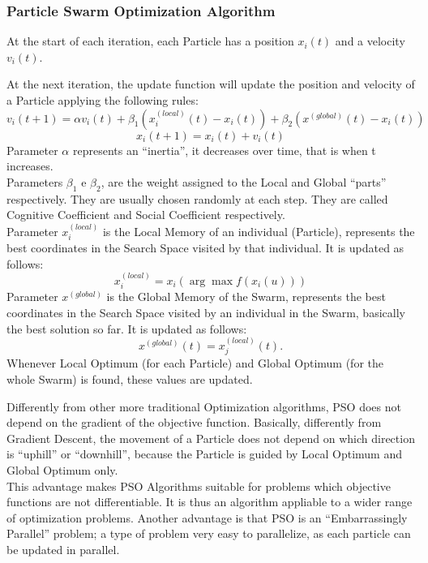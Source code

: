 \subsubsection{Particle Swarm Optimization Algorithm}

At the start of each iteration, each Particle has a position $x_i(t)$ and a velocity $v_i(t)$.

\label{sec:hyperlink-2}
At the next iteration, the update function will update the position and velocity of a Particle applying the following rules:
\begin{equation}
	v_i(t+1) = \alpha v_i(t) + \beta_1(x_i^{(local)}(t) - x_i(t)) + \beta_2(x^{(global)}(t) - x_i(t))
\end{equation}
\begin{equation}
	x_i(t+1) = x_i(t) + v_i(t)
\end{equation}
Parameter $\alpha$ represents an “inertia”, it decreases over time, that is when t increases.
\\[0.3cm]Parameters $\beta_1$ e $\beta_2$, are the weight assigned to the Local and Global “parts” respectively. They are usually chosen randomly at each step. They are called Cognitive Coefficient and Social Coefficient respectively.
\\[0.3cm]Parameter  $x_i^{(local)}$  is the Local Memory of an individual (Particle), represents the best coordinates in the Search Space visited by that individual. It is updated as follows:
\begin{equation}
	x_i^{(local)} = x_i(\arg \max f(x_i(u)))
\end{equation}
Parameter $x^{(global)}$ is the Global Memory of the Swarm, represents the best coordinates in the Search Space visited by an individual in the Swarm, basically the best solution so far. It is updated as follows:
\begin{equation}
	x^{(global)}(t) = x_j^{(local)}(t).
\end{equation}
Whenever Local Optimum (for each Particle) and Global Optimum (for the whole Swarm) is found, these values are updated.

Differently from other more traditional Optimization algorithms, PSO does not depend on the gradient of the objective function.
Basically, differently from Gradient Descent, the movement of a Particle does not depend on which direction is “uphill” or “downhill”, because the Particle is guided by Local Optimum and Global Optimum only.
\\[0.3cm]This advantage makes PSO Algorithms suitable for problems which objective functions are not differentiable. It is thus an algorithm appliable to a wider range of optimization problems.
Another advantage is that PSO is an “Embarrassingly Parallel” problem; a type of problem very easy to parallelize, as each particle can be updated in parallel.

